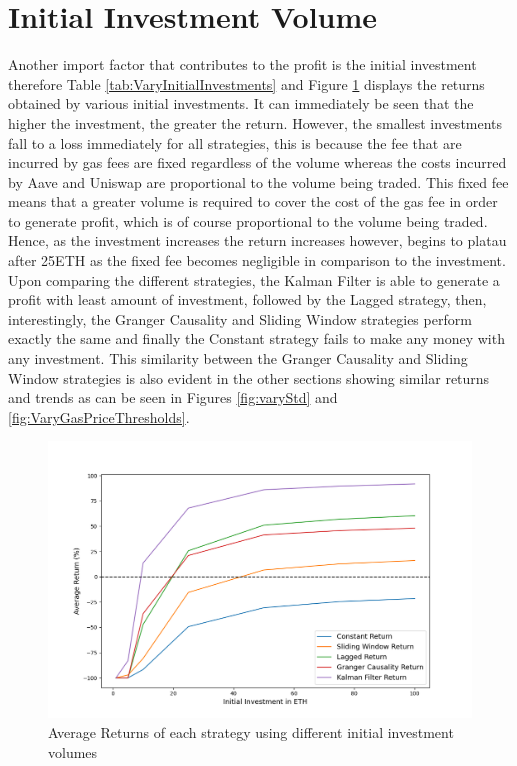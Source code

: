 \section{Initial Investment Volume}
Another import factor that contributes to the profit is the initial investment therefore Table \ref{tab:VaryInitialInvestments} and Figure \ref{fig:VaryInitialInvestments} displays the returns obtained by various initial investments. It can immediately be seen that the higher the investment, the greater the return. However, the smallest investments fall to a loss immediately for all strategies, this is because the fee that are incurred by gas fees are fixed regardless of the volume whereas the costs incurred by Aave and Uniswap are proportional to the volume being traded. This fixed fee means that a greater volume is required to cover the cost of the gas fee in order to generate profit, which is of course proportional to the volume being traded. Hence, as the investment increases the return increases however, begins to platau after 25ETH as the fixed fee becomes negligible in comparison to the investment.
\\[5mm]
Upon comparing the different strategies, the Kalman Filter is able to generate a profit with least amount of investment, followed by the Lagged strategy, then, interestingly, the Granger Causality and Sliding Window strategies perform exactly the same and finally the Constant strategy fails to make any money with any investment. This similarity between the Granger Causality and Sliding Window strategies is also evident in the other sections showing similar returns and trends as can be seen in Figures \ref{fig:varyStd} and \ref{fig:VaryGasPriceThresholds}.

\begin{figure}[H]
    \centering
    \includegraphics[width=\linewidth]{evaluation/Images/VaryII.png}
    \caption{Average Returns of each strategy using different initial investment volumes}
    \label{fig:VaryInitialInvestments}
\end{figure}

